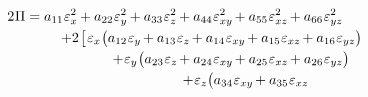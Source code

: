 \nopagebreak\vspace{-0.2em}
\begin{equation}\label{elasticenergylooongcartesian}
\begin{gathered}
\hspace{-5em}
2 \hspace{.1ex} \potentialenergydensity
= a_{11} \infinitesimaldeformationcomponents{x}^2 \hspace{-0.1ex}
+ a_{22} \infinitesimaldeformationcomponents{y}^2 \hspace{-0.1ex}
+ a_{33} \infinitesimaldeformationcomponents{z}^2 \hspace{-0.1ex}
+ a_{44} \infinitesimaldeformationcomponents{xy}^2 \hspace{-0.2ex}
+ a_{55} \infinitesimaldeformationcomponents{xz}^2 \hspace{-0.2ex}
+ a_{66} \infinitesimaldeformationcomponents{yz}^2
\\[-0.1em]
%
\hspace{.2em}
+ 2 \hspace{.2ex} \bigl[ \hspace{.1ex}
%
\infinitesimaldeformationcomponents{x} \hspace{.1ex}
\bigl( a_{12} \infinitesimaldeformationcomponents{y} \hspace{-0.2ex}
+ a_{13} \infinitesimaldeformationcomponents{z} \hspace{-0.2ex}
+ a_{14} \infinitesimaldeformationcomponents{xy} \hspace{-0.2ex}
+ a_{15} \infinitesimaldeformationcomponents{xz} \hspace{-0.2ex}
+ a_{16} \infinitesimaldeformationcomponents{yz} \bigr)
\\[-0.1em]
%
\hspace{3em}
+ \infinitesimaldeformationcomponents{y} \hspace{.1ex} \bigl(
a_{23} \infinitesimaldeformationcomponents{z} \hspace{-0.2ex}
+ a_{24} \infinitesimaldeformationcomponents{xy} \hspace{-0.2ex}
+ a_{25} \infinitesimaldeformationcomponents{xz} \hspace{-0.2ex}
+ a_{26} \infinitesimaldeformationcomponents{yz} \bigr)
\\[-0.1em]
%
\hspace{5em}
+ \infinitesimaldeformationcomponents{z} \bigl(
a_{34} \infinitesimaldeformationcomponents{xy} \hspace{-0.2ex}
+ a_{35} \infinitesimaldeformationcomponents{xz} \hspace{-0.2ex}

\end{gathered}
\end{equation}
